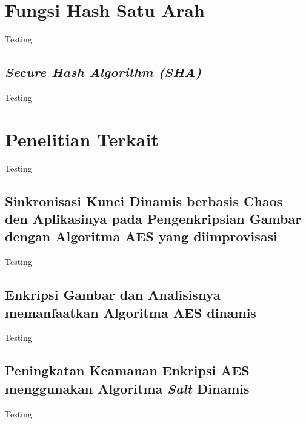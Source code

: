 \section{Fungsi Hash Satu Arah}
Testing

\subsection{\emph{Secure Hash Algorithm (SHA)}}
Testing

\section{Penelitian Terkait}
Testing

\subsection{Sinkronisasi Kunci Dinamis berbasis Chaos den Aplikasinya pada Pengenkripsian Gambar dengan Algoritma AES yang diimprovisasi}
Testing

\subsection{Enkripsi Gambar dan Analisisnya memanfaatkan Algoritma AES dinamis}
Testing

\subsection{Peningkatan Keamanan Enkripsi AES menggunakan Algoritma \emph{Salt} Dinamis}
Testing
